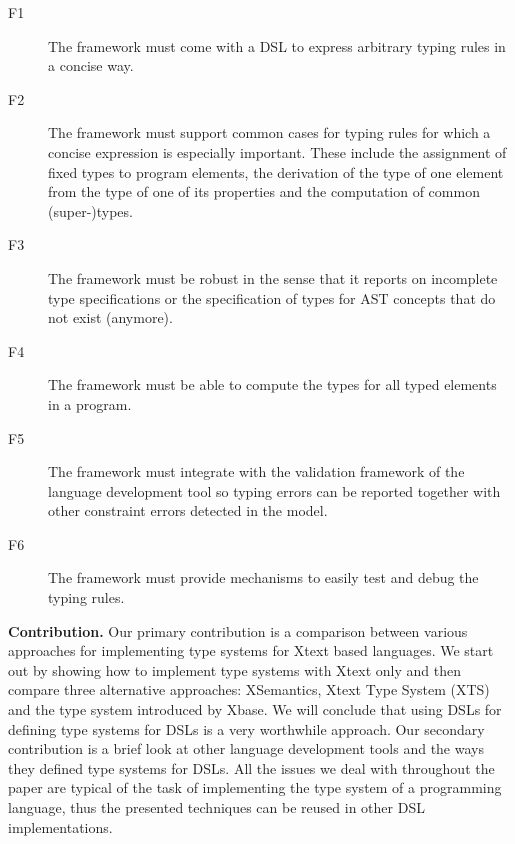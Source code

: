 \begin{description}
  \item[F1] The framework must come with a DSL to express arbitrary typing
  rules in a concise way. 
  \item[F2] The framework must support common cases for typing rules for
  which a concise expression is especially important. These include the 
  assignment of fixed types to program elements, the derivation of the type of one 
  element from the type of one of its properties and the computation of common (super-)types.
  \item[F3] The framework must be robust in the sense that it reports on
  incomplete type specifications or the specification of types for AST concepts
  that do not exist (anymore).
  \item[F4] The framework must be able to compute the types for all typed
  elements in a program. 
  \item[F5]  The framework must integrate with the validation framework of the
  language development tool so typing errors can be reported together with other
  constraint errors detected in the model.
  \item[F6]  The framework must provide mechanisms to easily test and debug the
  typing rules.
\end{description}


\textbf{Contribution.} Our primary contribution is a comparison between various
approaches for implementing type systems for Xtext based languages. We start out
by showing how to implement type systems with Xtext only and then compare three
alternative approaches: XSemantics, Xtext Type System (XTS) and the type system
introduced by Xbase. We will conclude that using DSLs for defining type systems
for DSLs is a very worthwhile approach. Our secondary contribution is a brief
look at other language development tools and the ways they defined type systems
for DSLs.
All the issues we deal with throughout the paper are typical of the task of
implementing the type system of a programming language, thus the presented
techniques can be reused in other DSL implementations.

